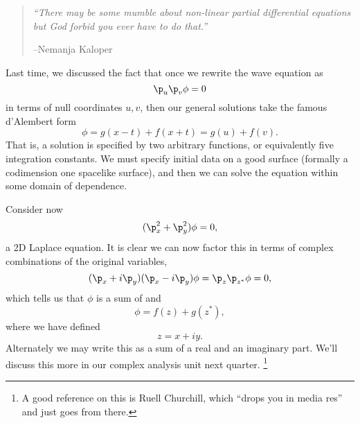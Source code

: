\begin{quote}
    \textit{``There may be some mumble about non-linear partial differential equations but God forbid you ever have to do that.''}
    
    --Nemanja Kaloper
\end{quote}

Last time, we discussed the fact that once we rewrite the wave equation as
\begin{equation}
    \p_u \p_v \phi=0
\end{equation}
in terms of null coordinates $u,v$, then our general solutions take the famous d'Alembert form
\begin{equation}
    \phi=g(x-t) + f(x+t) =g(u) + f(v).
\end{equation}
That is, a solution is specified by two arbitrary functions, or equivalently five integration constants. We must specify initial data on a good surface (formally a codimension one spacelike surface), and then we can solve the equation within some domain of dependence.

Consider now
\begin{equation}
    (\p_x^2 + \p_y^2) \phi =0,
\end{equation}
a 2D Laplace equation. It is clear we can now factor this in terms of complex combinations of the original variables,
\begin{equation}
    (\p_x + i\p_y)(\p_x - i\p_y) \phi=\p_z \p_{z^*}\phi =0,
\end{equation}
which tells us that $\phi$ is a sum of  and 
\begin{equation}
    \phi = f(z) + g(z^*),
\end{equation}
where we have defined
\begin{equation}
    z= x+ iy.
\end{equation}
Alternately we may write this as a sum of a real and an imaginary part. We'll discuss this more in our complex analysis unit next quarter.%
    \footnote{A good reference on this is Ruell Churchill, which ``drops you in media res'' and just goes from there.}
    
